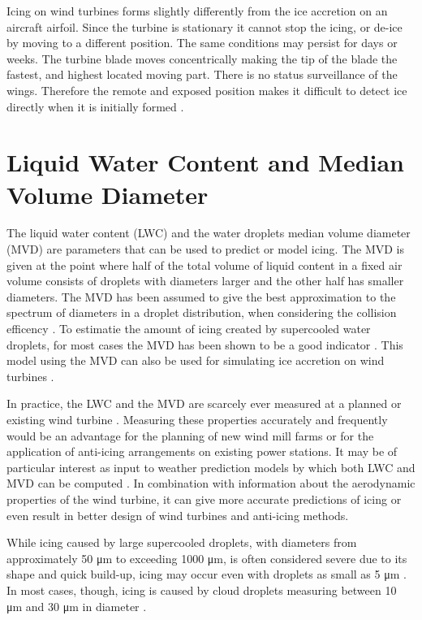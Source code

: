 Icing on wind turbines forms slightly differently from the ice accretion on an aircraft airfoil. Since the turbine is stationary it cannot stop the icing, or de-ice by moving to a different position. The same conditions may persist for days or weeks. The turbine blade moves concentrically making the tip of the blade the fastest, and highest located moving part. There is no status surveillance of the wings. Therefore the remote and exposed position makes it difficult to detect ice directly when it is initially formed \cite{homo2006}.

\section{Liquid Water Content and Median Volume Diameter}

The liquid water content (LWC) and the water droplets median volume diameter (MVD) are parameters that can be used to predict or model icing. The  MVD is given at the point where half of the total volume of liquid content in a fixed air volume consists of droplets with diameters larger and the other half has smaller diameters. The MVD has been assumed to give the best approximation to the spectrum of diameters in a droplet distribution, when considering the collision efficency \cite{fins1988}. To estimatie the amount of icing created by supercooled water droplets, for most cases the MVD has been shown to be a good indicator \cite{makk2000}. This model using the MVD can also be used for simulating ice accretion on wind turbines \cite{dier2011}.

In practice, the LWC and the MVD are scarcely ever measured at a planned or existing wind turbine \cite{parent2011, makk1992}. Measuring these properties accurately and frequently would be an advantage for the planning of new wind mill farms or for the application of anti-icing arrangements on existing power stations. It may be of particular interest as input to weather prediction models by which both LWC and MVD can be computed \cite{thomp2009, nyga2011}. In combination with information about the aerodynamic properties of the wind turbine, it can give more accurate predictions of icing or even result in better design of wind turbines and anti-icing methods.

While icing caused by large supercooled droplets, with diameters from approximately 50 μm to exceeding 1000 μm, is often considered severe due to its shape and quick build-up, icing may occur even with droplets as small as 5 μm \cite{sand1984, cob2001, homo2010}. In most cases, though, icing is caused by cloud droplets measuring between 10 μm and 30 μm in diameter \cite{makk1992, cob2001}.

